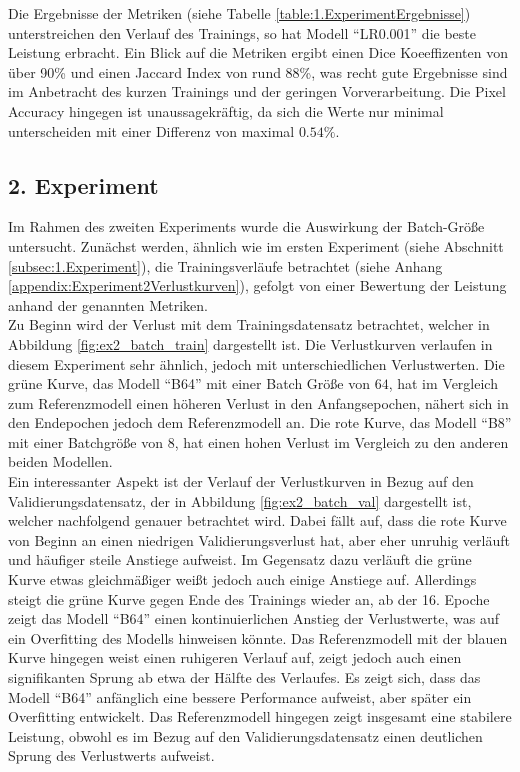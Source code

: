 Die Ergebnisse der Metriken (siehe Tabelle \ref{table:1.ExperimentErgebnisse}) unterstreichen den Verlauf des Trainings, so hat Modell ``LR0.001'' die beste Leistung erbracht. Ein Blick auf die Metriken ergibt einen Dice Koeeffizenten von über 90\% und einen Jaccard Index von rund 88\%, was recht gute Ergebnisse sind im Anbetracht des kurzen Trainings und der geringen Vorverarbeitung. Die Pixel Accuracy hingegen ist unaussagekräftig, da sich die Werte nur minimal unterscheiden mit einer Differenz von maximal $0.54\%$.

\subsection{2. Experiment}
Im Rahmen des zweiten Experiments wurde die Auswirkung der Batch-Größe untersucht. Zunächst werden, ähnlich wie im ersten Experiment (siehe Abschnitt \ref{subsec:1.Experiment}), die Trainingsverläufe betrachtet (siehe Anhang \ref{appendix:Experiment2Verlustkurven}), gefolgt von einer Bewertung der Leistung anhand der genannten Metriken.\\
Zu Beginn wird der Verlust mit dem Trainingsdatensatz betrachtet, welcher in Abbildung \ref{fig:ex2_batch_train} dargestellt ist. Die Verlustkurven verlaufen in diesem Experiment sehr ähnlich, jedoch mit unterschiedlichen Verlustwerten. Die grüne Kurve, das Modell ``B64'' mit einer Batch Größe von $64$, hat im Vergleich zum Referenzmodell einen höheren Verlust in den Anfangsepochen, nähert sich in den Endepochen jedoch dem Referenzmodell an. Die rote Kurve, das Modell ``B8'' mit einer Batchgröße von $8$, hat einen hohen Verlust im Vergleich zu den anderen beiden Modellen. \\
Ein interessanter Aspekt ist der Verlauf der Verlustkurven in Bezug auf den Validierungsdatensatz, der in Abbildung \ref{fig:ex2_batch_val} dargestellt ist, welcher nachfolgend genauer betrachtet wird. Dabei fällt auf, dass die rote Kurve von Beginn an einen niedrigen Validierungsverlust hat, aber eher unruhig verläuft und häufiger steile Anstiege aufweist. Im Gegensatz dazu verläuft die grüne Kurve etwas gleichmäßiger weißt jedoch auch einige Anstiege auf. Allerdings steigt die grüne Kurve gegen Ende des Trainings wieder an, ab der 16. Epoche zeigt das Modell ``B64'' einen kontinuierlichen Anstieg der Verlustwerte, was auf ein Overfitting des Modells hinweisen könnte. Das Referenzmodell mit der blauen Kurve hingegen weist einen ruhigeren Verlauf auf, zeigt jedoch auch einen signifikanten Sprung ab etwa der Hälfte des Verlaufes. Es zeigt sich, dass das Modell ``B64'' anfänglich eine bessere Performance aufweist, aber später ein Overfitting entwickelt. Das Referenzmodell hingegen zeigt insgesamt eine stabilere Leistung, obwohl es im Bezug auf den Validierungsdatensatz einen deutlichen Sprung des Verlustwerts aufweist. 

